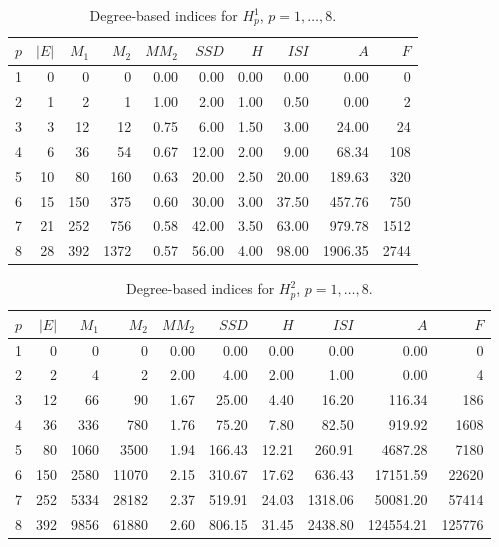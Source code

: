 \documentclass[letterpaper,12pt]{article}
\begin{document}
\begin{table}[H]
\centering

\begin{tabular}{r|r r r r r r r r r}
\toprule
$p$ & $|E|$ & $M_1$ & $M_2$ & $MM_2$ & $SSD$ & $H$ & $ISI$ & $A$ & $F$ \\
\midrule
1 & 0 & 0 & 0 & 0.00 & 0.00 & 0.00 & 0.00 & 0.00 & 0 \\
2 & 1 & 2 & 1 & 1.00 & 2.00 & 1.00 & 0.50 & 0.00 & 2 \\
3 & 3 & 12 & 12 & 0.75 & 6.00 & 1.50 & 3.00 & 24.00 & 24 \\
4 & 6 & 36 & 54 & 0.67 & 12.00 & 2.00 & 9.00 & 68.34 & 108 \\
5 & 10 & 80 & 160 & 0.63 & 20.00 & 2.50 & 20.00 & 189.63 & 320 \\
6 & 15 & 150 & 375 & 0.60 & 30.00 & 3.00 & 37.50 & 457.76 & 750 \\
7 & 21 & 252 & 756 & 0.58 & 42.00 & 3.50 & 63.00 & 979.78 & 1512 \\
8 & 28 & 392 & 1372 & 0.57 & 56.00 & 4.00 & 98.00 & 1906.35 & 2744 \\
\bottomrule
\end{tabular}
\caption{Degree-based indices for $H_{p}^{1}$, $p = 1, \dots, 8$.}
\label{tab:indices-n1-p1to8}
\end{table}
\begin{table}[H]
\centering

\begin{tabular}{r|r r r r r r r r r}
\toprule
$p$ & $|E|$ & $M_1$ & $M_2$ & $MM_2$ & $SSD$ & $H$ & $ISI$ & $A$ & $F$ \\
\midrule
1 & 0 & 0 & 0 & 0.00 & 0.00 & 0.00 & 0.00 & 0.00 & 0 \\
2 & 2 & 4 & 2 & 2.00 & 4.00 & 2.00 & 1.00 & 0.00 & 4 \\
3 & 12 & 66 & 90 & 1.67 & 25.00 & 4.40 & 16.20 & 116.34 & 186 \\
4 & 36 & 336 & 780 & 1.76 & 75.20 & 7.80 & 82.50 & 919.92 & 1608 \\
5 & 80 & 1060 & 3500 & 1.94 & 166.43 & 12.21 & 260.91 & 4687.28 & 7180 \\
6 & 150 & 2580 & 11070 & 2.15 & 310.67 & 17.62 & 636.43 & 17151.59 & 22620 \\
7 & 252 & 5334 & 28182 & 2.37 & 519.91 & 24.03 & 1318.06 & 50081.20 & 57414 \\
8 & 392 & 9856 & 61880 & 2.60 & 806.15 & 31.45 & 2438.80 & 124554.21 & 125776 \\
\bottomrule
\end{tabular}
\caption{Degree-based indices for $H_{p}^{2}$, $p = 1, \dots, 8$.}
\label{tab:indices-n2-p1to8}
\end{table}
\end{document}
